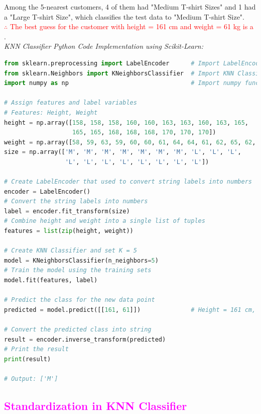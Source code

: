 \documentclass{book}
\begin{document}
Among the 5-nearest customers, 4 of them had "Medium T-shirt Sizes" and 1 had a "Large T-shirt Size", which classifies the test data to "Medium T-shirt Size".\\
\textcolor{red}{$\therefore$ The best guess for the customer with height = 161 cm and weight = 61 kg is a }.\\
\vspace{4mm}
\textit{\large{KNN Classifier Python Code Implementation using Scikit-Learn:}}
\begin{lstlisting}[language=Python, basicstyle=\ttfamily\small, keywordstyle=\color{blue}, commentstyle=\color{forestgreen}, stringstyle=\color{red}]
from sklearn.preprocessing import LabelEncoder      # Import LabelEncoder functions
from sklearn.Neighbors import KNeighborsClassifier  # Import KNN Classifier functions
import numpy as np                                  # Import numpy functions

# Assign features and label variables
# Features: Height, Weight
height = np.array([158, 158, 158, 160, 160, 163, 163, 160, 163, 165,
                   165, 165, 168, 168, 168, 170, 170, 170])
weight = np.array([58, 59, 63, 59, 60, 60, 61, 64, 64, 61, 62, 65, 62, 63, 66, 63, 64, 68])
size = np.array(['M', 'M', 'M', 'M', 'M', 'M', 'M', 'L', 'L', 'L', 
                 'L', 'L', 'L', 'L', 'L', 'L', 'L', 'L'])

# Create LabelEncoder that used to convert string labels into numbers
encoder = LabelEncoder()
# Convert the string labels into numbers
label = encoder.fit_transform(size)
# Combine height and weight into a single list of tuples
features = list(zip(height, weight))

# Create KNN Classifier and set K = 5
model = KNeighborsClassifier(n_neighbors=5)
# Train the model using the training sets
model.fit(features, label)

# Predict the class for the new data point
predicted = model.predict([[161, 61]])              # Height = 161 cm, Weight = 61 kg

# Convert the predicted class into string
result = encoder.inverse_transform(predicted)
# Print the result
print(result)

# Output: ['M']
\end{lstlisting}
\newpage
\textcolor{magenta}{\section{\textbf{Standardization in KNN Classifier}}}
\end{document}
